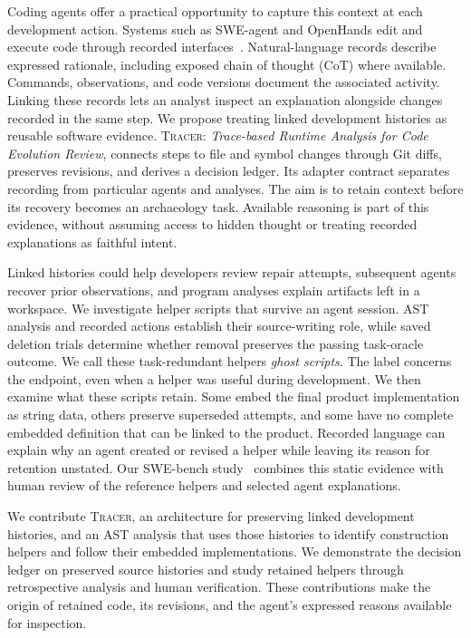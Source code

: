 \documentclass[10pt,conference]{IEEEtran}
\newcommand{\tracer}{\textsc{Tracer}}
\begin{document}
Coding agents offer a practical opportunity to capture this context at each development action. Systems such as SWE-agent and OpenHands edit and execute code through recorded interfaces~\cite{sweagent,openhands,codeact}. Natural-language records describe expressed rationale, including exposed chain of thought (CoT) where available. Commands, observations, and code versions document the associated activity. Linking these records lets an analyst inspect an explanation alongside changes recorded in the same step. We propose treating linked development histories as reusable software evidence. \tracer{}: \emph{Trace-based Runtime Analysis for Code Evolution Review}, connects steps to file and symbol changes through Git diffs, preserves revisions, and derives a decision ledger. Its adapter contract separates recording from particular agents and analyses. The aim is to retain context before its recovery becomes an archaeology task. Available reasoning is part of this evidence, without assuming access to hidden thought or treating recorded explanations as faithful intent.

Linked histories could help developers review repair attempts, subsequent agents recover prior observations, and program analyses explain artifacts left in a workspace. We investigate helper scripts that survive an agent session. AST analysis and recorded actions establish their source-writing role, while saved deletion trials determine whether removal preserves the passing task-oracle outcome. We call these task-redundant helpers \emph{ghost scripts}. The label concerns the endpoint, even when a helper was useful during development. We then examine what these scripts retain. Some embed the final product implementation as string data, others preserve superseded attempts, and some have no complete embedded definition that can be linked to the product. Recorded language can explain why an agent created or revised a helper while leaving its reason for retention unstated. Our SWE-bench study~\cite{swebench} combines this static evidence with human review of the reference helpers and selected agent explanations.

We contribute \tracer{}, an architecture for preserving linked development histories, and an AST analysis that uses those histories to identify construction helpers and follow their embedded implementations. We demonstrate the decision ledger on preserved source histories and study retained helpers through retrospective analysis and human verification. These contributions make the origin of retained code, its revisions, and the agent's expressed reasons available for inspection.
\end{document}

